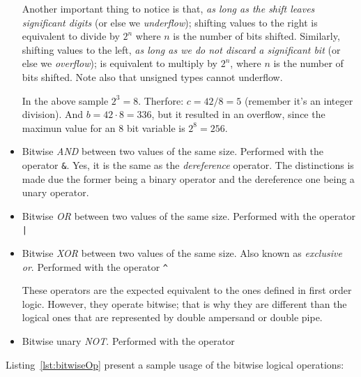 \begin{itemize}
Another important thing to notice is that, \emph{as long as the shift leaves significant digits} (or else we \emph{underflow}); shifting values to the right is equivalent to divide by $2^n$ where $n$ is the number of bits shifted.
Similarly, shifting values to the left, \emph{as long as we do not discard a significant bit} (or else we \emph{overflow}); is equivalent to multiply by $2^n$, where $n$ is the number of bits shifted.
Note also that unsigned types cannot underflow.

In the above sample $2^3 = 8$. Therfore: $c = 42 / 8 = 5$ (remember it's an integer division).
And $b = 42 \cdot 8 = 336$, but it resulted in an overflow, since the maximun value for an $8$ bit variable is $2^8 = 256$.

\item Bitwise \emph{AND} between two values of the same size. Performed with the operator \texttt{&}. Yes, it is the same as the \emph{dereference} operator. The distinctions is made due the former being a binary operator and the dereference one being a unary operator.
\item Bitwise \emph{OR} between two values of the same size. Performed with the operator \texttt{|}
\item Bitwise \emph{XOR} between two values of the same size. Also known as \emph{exclusive or}. Performed with the operator \texttt{^}

These operators are the expected equivalent to the ones defined in first order logic.
However, they operate bitwise; that is why they are different than the logical ones that are represented by double ampersand or double pipe.

\item Bitwise unary \emph{NOT}. Performed with the operator \texttt{~}
\end{itemize}

Listing~\ref{lst:bitwiseOp} present a sample usage of the bitwise logical operations:

{\centering
\begin{minipage}{\linewidth}
\end{minipage}
\par
}

